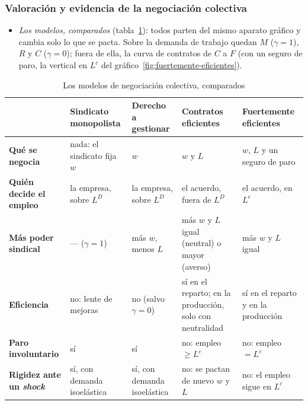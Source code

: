 \documentclass[11pt]{article}
\begin{document}
\subsubsection{Valoración y evidencia de la negociación colectiva}\label{sec:negociacion-practica}

\begin{itemize}
\item \emph{Los modelos, comparados} (tabla~\ref{tab:modelos-negociacion}): todos parten del mismo aparato gráfico y cambia solo lo que se pacta. Sobre la demanda de trabajo quedan $M$ ($\gamma=1$), $R$ y $C$ ($\gamma=0$); fuera de ella, la curva de contratos de $C$ a $F$ (con un seguro de paro, la vertical en $L^c$ del gráfico~\ref{fig:fuertemente-eficientes}).
\end{itemize}

\begin{table}[H]
\centering
\caption{Los modelos de negociación colectiva, comparados}\label{tab:modelos-negociacion}
\small
\begin{tabular}{>{\raggedright\arraybackslash}m{2.6cm}>{\centering\arraybackslash}m{2.9cm}>{\centering\arraybackslash}m{2.9cm}>{\centering\arraybackslash}m{2.9cm}>{\centering\arraybackslash}m{2.9cm}}
\toprule
\rowcolor{tceeazulpalido} & \textbf{Sindicato monopolista} & \textbf{Derecho a gestionar} & \textbf{Contratos eficientes} & \textbf{Fuertemente eficientes}\\
\midrule
\textbf{Qué se negocia} & nada: el sindicato fija $w$ & $w$ & $w$ y $L$ & $w$, $L$ y un seguro de paro\\
\addlinespace[0.3em]
\textbf{Quién decide el empleo} & la empresa, sobre $L^D$ & la empresa, sobre $L^D$ & el acuerdo, fuera de $L^D$ & el acuerdo, en $L^c$\\
\addlinespace[0.3em]
\textbf{Más poder sindical} & — ($\gamma=1$) & \textcolor{tceerojo}{más $w$, menos $L$} & \textcolor{tceeverde}{más $w$ y $L$ igual (neutral) o mayor (averso)} & \textcolor{tceeverde}{más $w$ y $L$ igual}\\
\addlinespace[0.3em]
\textbf{Eficiencia} & \textcolor{tceerojo}{no: lente de mejoras} & \textcolor{tceerojo}{no (salvo $\gamma=0$)} & \textcolor{tceeverde}{sí en el reparto; en la producción, solo con neutralidad} & \textcolor{tceeverde}{sí en el reparto y en la producción}\\
\addlinespace[0.3em]
\textbf{Paro involuntario} & sí & sí & no: empleo $\geq L^c$ & no: empleo $=L^c$\\
\addlinespace[0.3em]
\textbf{Rigidez ante un \emph{shock}} & sí, con demanda isoelástica & sí, con demanda isoelástica & no: se pactan de nuevo $w$ y $L$ & no: el empleo sigue en $L^c$\\
\bottomrule
\end{tabular}
\end{table}
\end{document}
